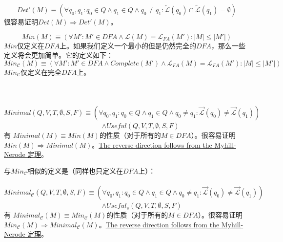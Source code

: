{{{{
$$ Det'(M) \equiv (\forall q_0,q_1 : q_0 \in Q \land q_1 \in Q \land q_0 \not= q_1 : \overleftarrow{\mathcal{L}}(q_0) \cap \overleftarrow{\mathcal{L}}(q_1) = \emptyset ) $$
很容易证明$Det(M) \Rightarrow Det'(M)$。
\newline

$$ Min(M) \equiv (\forall M' : M' \in DFA \land \mathcal{L}(M) = \mathcal{L}_{FA}(M') : |M| \leq |M'| ) $$
$Min$仅定义在$DFA$上。如果我们定义一个最小的但是仍然完全的$DFA$，那么一些定义将会更加简单。它的定义如下：
$$ Min_{\mathcal{C}}(M) \equiv ( \forall M':M' \in DFA \land Complete(M') \land \mathcal{L}_{FA}(M) = \mathcal{L}_{FA}(M'): |M| \leq |M'| ) $$
$Min_{\mathcal{C}}$仅定义在完全$DFA$上。 \\

 \\

 \\
\mbox{　　}$Minimal(Q,V,T,\emptyset,S,F) \equiv  ( \forall q_0,q_1:q_0 \in Q \land q_1 \in Q \land q_0 \not= q_1 : \overrightarrow{\mathcal{L}}(q_0) \not= \overrightarrow{\mathcal{L}}(q_1)  )$ \\
\mbox{　　　　　　　　　　　　　　} $\land Useful(Q,V,T,\emptyset,S,F)$ \\
有 $Minimal(M) \equiv Min(M)$的性质（对于所有的$M\in DFA$）。很容易证明$Min(M) \Rightarrow Minimal(M)$。\uline{The reverse direction follows from the Myhill-Nerode 定理}。

与$Min_{\mathcal{C}}$相似的定义是（同样也只定义在$DFA$上）：\\
\mbox{　　}$Minimal_{\mathcal{C}}(Q,V,T,\emptyset,S,F) \equiv  ( \forall q_0,q_1:q_0 \in Q \land q_1 \in Q \land q_0 \not= q_1 : \overrightarrow{\mathcal{L}}(q_0) \not= \overrightarrow{\mathcal{L}}(q_1)  )$ \\
\mbox{　　　　　　　　　　　　　　} $\land Useful_s (Q,V,T,\emptyset,S,F)$ \\
有 $Minimal_{\mathcal{C}}(M) \equiv Min_{\mathcal{C}}(M)$的性质（对于所有的$M\in DFA$）。很容易证明$Min_{\mathcal{C}}(M) \Rightarrow Minimal_{\mathcal{C}}(M)$。\uline{The reverse direction follows from the Myhill-Nerode 定理}。

}}}}
